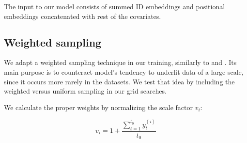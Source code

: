 \documentclass[en]{pracamgr}
\newtheorem{defi}{Definition}[section]
\begin{document}
The input to our model consists of summed ID embeddings and positional embeddings concatenated with rest of the covariates.


\subsection{Weighted sampling}

We adapt a weighted sampling technique in our training, similarly to \cite{enhancing} and \cite{deepar}. Its main purpose is to counteract model's tendency to underfit data of a large scale, since it occurs more rarely in the datasets. We test that idea by including the weighted versus uniform sampling in our grid searches.

We calculate the proper weights by normalizing the scale factor $v_i$:

$$ v_i = 1 + \frac{\sum^{t_0}_{t=1} y^{(i)}_t}{t_0} $$



%



\end{document}
